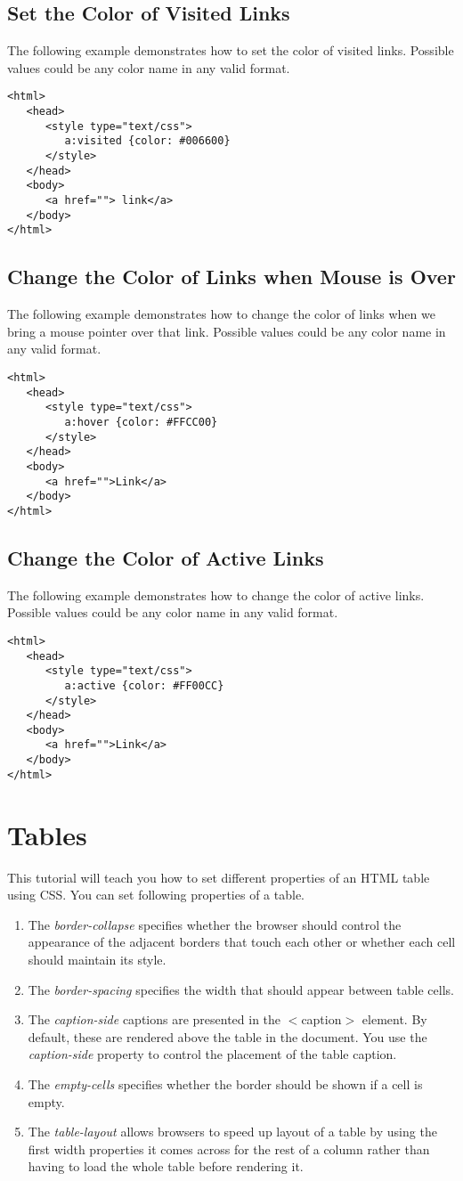 \documentclass[a4paper,oneside]{book}
\numberwithin{equation}{chapter}
\begin{document}
\subsection{Set the Color of Visited Links}
The following example demonstrates how to set the color of visited links. Possible values could be any color name in any valid format.
\begin{verbatim}
<html>
   <head>
      <style type="text/css">
         a:visited {color: #006600}
      </style>
   </head>
   <body>
      <a href=""> link</a> 
   </body>
</html> 
\end{verbatim}
\subsection{Change the Color of Links when Mouse is Over}
The following example demonstrates how to change the color of links when we bring a mouse pointer over that link. Possible values could be any color name in any valid format.
\begin{verbatim}
<html>
   <head>
      <style type="text/css">
         a:hover {color: #FFCC00}
      </style>
   </head>
   <body>
      <a href="">Link</a>
   </body>
</html> 
\end{verbatim}
\subsection{Change the Color of Active Links}
The following example demonstrates how to change the color of active links. Possible values could be any color name in any valid format.
\begin{verbatim}
<html>
   <head>
      <style type="text/css">
         a:active {color: #FF00CC}
      </style>
   </head>
   <body>
      <a href="">Link</a>
   </body>
</html> 
\end{verbatim}
\section{Tables}
This tutorial will teach you how to set different properties of an HTML table using CSS. You can set following properties of a table.
\begin{enumerate}
\item The \textit{border-collapse} specifies whether the browser should control the appearance of the adjacent borders that touch each other or whether each cell should maintain its style.
\item The \textit{border-spacing} specifies the width that should appear between table cells.
\item The \textit{caption-side} captions are presented in the $<$caption$>$ element. By default, these are rendered above the table in the document. You use the \textit{caption-side} property to control the placement of the table caption.
\item The \textit{empty-cells} specifies whether the border should be shown if a cell is empty.
\item The \textit{table-layout} allows browsers to speed up layout of a table by using the first width properties it comes across for the rest of a column rather than having to load the whole table before rendering it.
\end{enumerate}
\end{document}
